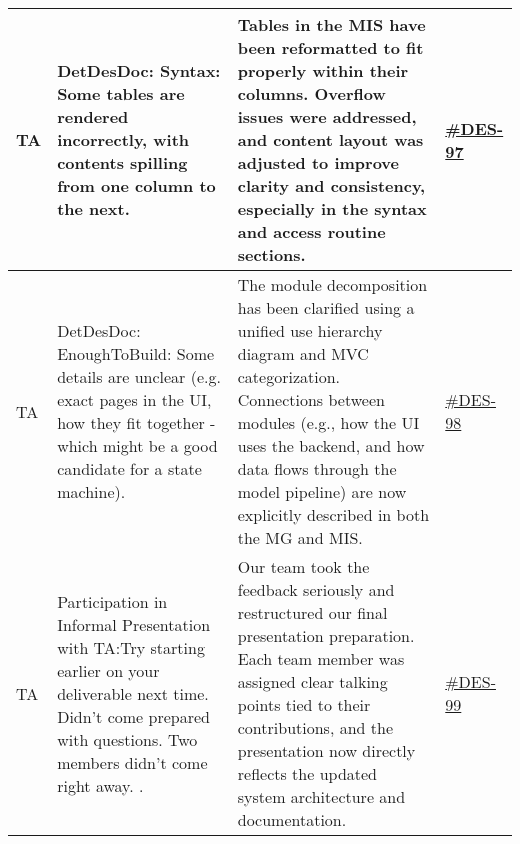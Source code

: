 \documentclass{article}
\begin{document}
\begin{longtable}{|p{1.48cm}|p{5cm}|p{4.7cm}|p{1cm}|}
TA & DetDesDoc: Syntax: Some tables are rendered incorrectly, with contents spilling from one column to the next. & Tables in the MIS have been reformatted to fit properly within their columns. Overflow issues were addressed, and content layout was adjusted to improve clarity and consistency, especially in the syntax and access routine sections. &\href{https://github.com/harrisonchiu/xray/issues/97}{\#DES-97}\\
\hline

TA & DetDesDoc: EnoughToBuild: Some details are unclear (e.g. exact pages in the UI, how they fit together - which might be a good candidate for a state machine). & The module decomposition has been clarified using a unified use hierarchy diagram and MVC categorization. Connections between modules (e.g., how the UI uses the backend, and how data flows through the model pipeline) are now explicitly described in both the MG and MIS.
 &\href{https://github.com/harrisonchiu/xray/issues/98}{\#DES-98}\\
\hline

TA & Participation in Informal Presentation with TA:Try starting earlier on your deliverable next time. Didn't come prepared with questions. Two members didn't come right away. . & Our team took the feedback seriously and restructured our final presentation preparation. Each team member was assigned clear talking points tied to their contributions, and the presentation now directly reflects the updated system architecture and documentation.&\href{https://github.com/harrisonchiu/xray/issues/99}{\#DES-99}\\
\hline

\end{longtable}
\end{document}
